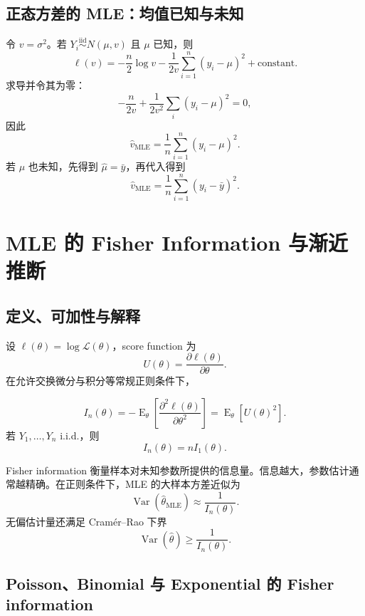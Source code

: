 \documentclass[11pt,a4paper]{article}
\theoremstyle{definition}
\theoremstyle{plain}
\theoremstyle{remark}
\newcommand{\E}{\operatorname{E}}
\newcommand{\Var}{\operatorname{Var}}
\begin{document}
\subsection{正态方差的 MLE：均值已知与未知}

令 $v=\sigma^2$。若 $Y_i\overset{\mathrm{iid}}{\sim}N(\mu,v)$ 且 $\mu$ 已知，则
\[
    \ell(v)
    =
    -\frac{n}{2}\log v
    -\frac{1}{2v}\sum_{i=1}^n(y_i-\mu)^2
    +\text{constant}.
\]
求导并令其为零：
\[
    -\frac{n}{2v}
    +
    \frac{1}{2v^2}\sum_i(y_i-\mu)^2=0,
\]
因此
\[
    \boxed{
    \hat v_{\mathrm{MLE}}
    =
    \frac{1}{n}\sum_{i=1}^n(y_i-\mu)^2.
    }
\]
若 $\mu$ 也未知，先得到 $\hat\mu=\bar y$，再代入得到
\[
    \boxed{
    \hat v_{\mathrm{MLE}}
    =
    \frac{1}{n}\sum_{i=1}^n(y_i-\bar y)^2.
    }
\]

\section{MLE 的 Fisher Information 与渐近推断}
\label{sec:fisher-information}

\subsection{定义、可加性与解释}

设 $\ell(\theta)=\log\mathcal L(\theta)$，score function 为
\[
    U(\theta)=\frac{\partial\ell(\theta)}{\partial\theta}.
\]
在允许交换微分与积分等常规正则条件下，

\begin{memorybox}
\[
    \boxed{
    I_n(\theta)
    =
    -\E_\theta\left[
        \frac{\partial^2\ell(\theta)}{\partial\theta^2}
    \right]
    =
    \E_\theta\left[U(\theta)^2\right].
    }
\]
若 $Y_1,\ldots,Y_n$ i.i.d.，则
\[
    \boxed{I_n(\theta)=nI_1(\theta).}
\]
\end{memorybox}

Fisher information 衡量样本对未知参数所提供的信息量。信息越大，参数估计通常越精确。在正则条件下，MLE 的大样本方差近似为
\[
    \Var(\hat\theta_{\mathrm{MLE}})
    \approx
    \frac{1}{I_n(\theta)}.
\]
无偏估计量还满足 Cram\'er--Rao 下界
\[
    \Var(\hat\theta)\ge\frac{1}{I_n(\theta)}.
\]

\subsection{Poisson、Binomial 与 Exponential 的 Fisher information}
\end{document}
